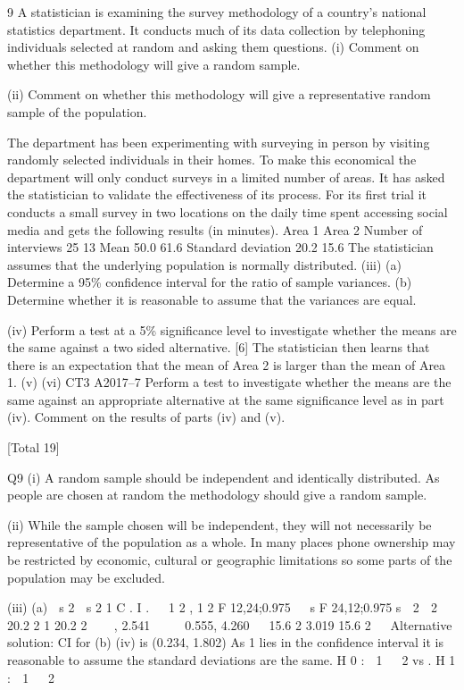 \documentclass[a4paper,12pt]{article}
\begin{document}
\begin{enumerate}
[Total 20]
9
A statistician is examining the survey methodology of a country’s national statistics
department. It conducts much of its data collection by telephoning individuals
selected at random and asking them questions.
(i) Comment on whether this methodology will give a random sample.

(ii) Comment on whether this methodology will give a representative random
sample of the population.

The department has been experimenting with surveying in person by visiting
randomly selected individuals in their homes. To make this economical the
department will only conduct surveys in a limited number of areas. It has asked the
statistician to validate the effectiveness of its process.
For its first trial it conducts a small survey in two locations on the daily time spent
accessing social media and gets the following results (in minutes).
Area 1
Area 2
Number of
interviews
25
13
Mean
50.0
61.6
Standard
deviation
20.2
15.6
The statistician assumes that the underlying population is normally distributed.
(iii)
(a) Determine a 95\% confidence interval for the ratio of sample variances.
(b) Determine whether it is reasonable to assume that the variances are
equal.

(iv)
Perform a test at a 5\% significance level to investigate whether the means are
the same against a two sided alternative.
[6]
The statistician then learns that there is an expectation that the mean of Area 2 is
larger than the mean of Area 1.
(v)
(vi)
CT3 A2017–7
Perform a test to investigate whether the means are the same against an
appropriate alternative at the same significance level as in part (iv).
Comment on the results of parts (iv) and (v).


[Total 19]

Q9
(i) A random sample should be independent and identically distributed. As
people are chosen at random the methodology should give a random sample.

(ii) While the sample chosen will be independent, they will not necessarily be
representative of the population as a whole. In many places phone ownership
may be restricted by economic, cultural or geographic limitations so some
parts of the population may be excluded.

(iii) (a)
 s 2

s 2
1
C . I .   1 2
, 1 2 F 12,24;0.975 
 s F 24,12;0.975 s

2
 2
 
 20.2 2 1 20.2 2

 
,
2.541
    0.555, 4.260 
 15.6 2 3.019 15.6 2

 
Alternative solution:
CI for
(b)
(iv)
is (0.234, 1.802)
As 1 lies in the confidence interval it is reasonable to assume the
standard deviations are the same.
H 0 :  1   2 vs . H 1 :  1   2




\end{enumerate}
\end{document}
